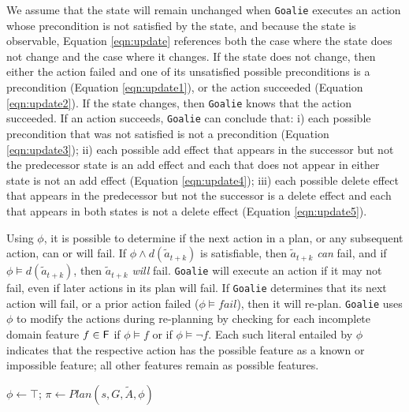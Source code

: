 \documentclass[letterpaper]{article}
\def\goalie{{\tt Goalie}}
\begin{document}
\noindent We assume that the state will remain unchanged when \goalie{} executes
an action whose precondition is not satisfied by the state, and because the
state is observable, Equation \ref{eqn:update} references both the case where
the state does not change and the case where it changes.  If the state does not
change, then either the action failed and one of its unsatisfied possible
preconditions is a precondition (Equation \ref{eqn:update1}), or the action
succeeded (Equation \ref{eqn:update2}).  If the state changes, then \goalie{}
knows that the action succeeded.  If an action succeeds, \goalie{} can conclude
that: i) each possible precondition that was not satisfied is not a precondition
(Equation \ref{eqn:update3}); ii) each possible add effect that appears in the
successor but not the predecessor state is an add effect and each that does not
appear in either state is not an add effect  (Equation \ref{eqn:update4}); iii)
each possible delete effect that appears in the predecessor but not the successor is a delete effect and
each that  appears in both states is not a delete effect (Equation \ref{eqn:update5}).

Using $\phi$, it is possible to determine if the next action in a plan, or any
subsequent action, can or will fail.  If  $\phi \wedge d(\tilde{a}_{t+k})$ is
satisfiable, then $\tilde{a}_{t+k}$ {\em can} fail, and if $\phi \models
d(\tilde{a}_{t+k})$, then $\tilde{a}_{t+k}$ {\em will}  fail.  \goalie{} will
execute an action if it may not fail, even if later actions in its plan will
fail.  If \goalie{} determines that its next action will fail, or a prior action
failed ($\phi \models fail$), then it will re-plan.  \goalie{}  uses $\phi$ to
modify the actions during re-planning by checking for each incomplete domain
feature $f \in {\sf F}$ if $\phi \models f$ or if $\phi \models \neg f$.  Each
such literal entailed by $\phi$ indicates that the respective action has the
possible feature as a known or impossible feature; all other features remain as
possible features.



\begin{algorithm}[t]
\SetLine
{}
 $\phi \leftarrow \top$; $\pi \leftarrow Plan(s, G, \tilde{A}, \phi)$\;
\caption{\goalie{}$(s, G, \tilde{A})$}\label{alg:replan}
\end{algorithm}
\end{document}
